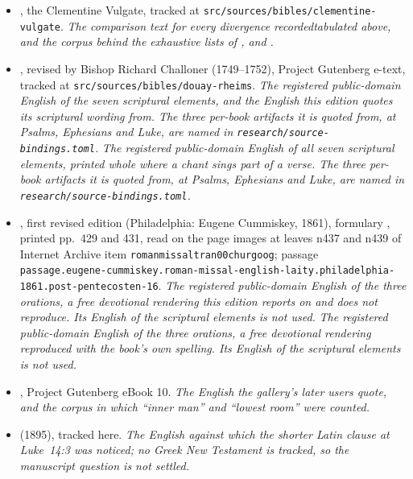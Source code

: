 \begin{itemize}[leftmargin=1.2em, itemsep=0.15em]
\item {}, the Clementine Vulgate, tracked at
\texttt{src/sources/bibles/clementine-vulgate}. \textit{The comparison text for
every divergence
\ifdefined\TriptychSynthesisEdition recorded\else tabulated\fi{} above, and the
corpus behind the exhaustive lists of
,  and .}
\item {}, revised by Bishop Richard Challoner
(1749--1752), Project Gutenberg e-text, tracked at
\texttt{src/sources/bibles/douay-rheims}.%
\ifdefined\TriptychSynthesisEdition{} \textit{The registered public-domain
English of the seven scriptural elements, and the English this edition quotes
its scriptural wording from. The three per-book artifacts it is quoted from, at
Psalms, Ephesians and Luke, are named in
\texttt{research/source-bindings.toml}.}%
\else{} \textit{The registered public-domain
English of all seven scriptural elements, printed whole where a chant sings part
of a verse. The three per-book artifacts it is quoted from, at Psalms,
Ephesians and Luke, are named in \texttt{research/source-bindings.toml}.}%
\fi
\item {}, first revised edition (Philadelphia: Eugene Cummiskey, 1861),
formulary , printed pp.~429 and 431, read on
the page images at leaves n437 and n439 of Internet Archive item
\texttt{romanmissaltran00churgoog}; passage
\texttt{passage.\allowbreak eugene-cummiskey.\allowbreak roman-missal-english-laity.\allowbreak philadelphia-1861.\allowbreak post-pentecosten-16}.
\ifdefined\TriptychSynthesisEdition
\textit{The registered public-domain English of the three orations, a free
devotional rendering this edition reports on and does not reproduce. Its English
of the scriptural elements is not used.}%
\else
\textit{The registered public-domain English of the three orations, a free
devotional rendering reproduced with the book's own spelling. Its English of the
scriptural elements is not used.}%
\fi
\item {}, Project Gutenberg eBook 10.
\textit{The English the gallery's later users quote, and the corpus in which
``inner man'' and ``lowest room'' were counted.}
\ifdefined\TriptychSynthesisEdition\else
\item {} (1895), tracked here. \textit{The English
against which the shorter Latin clause at Luke~14:3 was noticed; no Greek New
Testament is tracked, so the manuscript question is not settled.}
\fi
\end{itemize}

